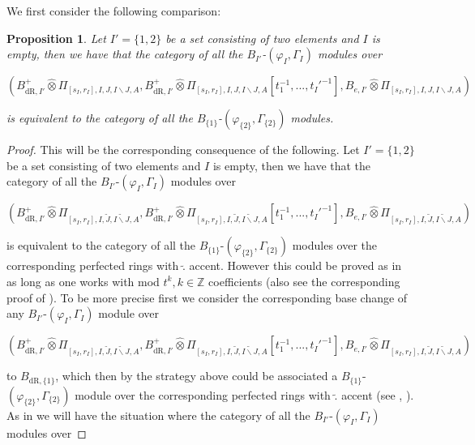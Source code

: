 \documentclass[12pt]{amsart}
\newtheorem{proposition}[theorem]{Proposition}
\theoremstyle{definition}
\numberwithin{equation}{section}
\begin{document}
\indent We first consider the following comparison:
%
\begin{proposition}
Let $I'=\{1,2\}$ be a set consisting of two elements and $I$ is empty, then we have that the category of all the $B_{I'}$-$(\varphi_I,\Gamma_I)$ modules over 
\begin{center}
$(B^+_{\mathrm{dR},I'}	\widehat{\otimes}\Pi_{[s_I,r_I],I,J,I\backslash J,A},B^+_{\mathrm{dR},I'}	\widehat{\otimes}\Pi_{[s_I,r_I],I,J,I\backslash J,A}[t_1^{-1},...,t_I'^{-1}],B_{e,I'}	\widehat{\otimes}\Pi_{[s_I,r_I],I,J,I\backslash J,A})$	
\end{center}
is equivalent to the category of all the $B_{\{1\}}$-$(\varphi_{\{2\}},\Gamma_{\{2\}})$ modules.
%
\end{proposition}
%
%
\begin{proof}
This will be the corresponding consequence of the following. Let $I'=\{1,2\}$ be a set consisting of two elements and $I$ is empty, then we have that the category of all the $B_{I'}$-$(\varphi_I,\Gamma_I)$ modules over 
\begin{center}
$(B^+_{\mathrm{dR},I'}	\widehat{\otimes}\Pi_{[s_I,r_I],I,\widetilde{J},\widetilde{I\backslash J},A},B^+_{\mathrm{dR},I'}	\widehat{\otimes}\Pi_{[s_I,r_I],I,\widetilde{J},\widetilde{I\backslash J},A}[t_1^{-1},...,t_I'^{-1}],B_{e,I'}	\widehat{\otimes}\Pi_{[s_I,r_I],I,\widetilde{J},\widetilde{I\backslash J},A})$	
\end{center}
is equivalent to the category of all the $B_{\{1\}}$-$(\varphi_{\{2\}},\Gamma_{\{2\}})$ modules over the corresponding perfected rings with $\widetilde{.}$ accent. However this could be proved as in \cite[Theorem 2.18]{KP} as long as one works with mod $t^k,k\in \mathbb{Z}$ coefficients (also see the corresponding proof of \cite[Proposition 3.8]{T3}). To be more precise first we consider the corresponding base change of any $B_{I'}$-$(\varphi_I,\Gamma_I)$ module over 
\begin{center}
$(B^+_{\mathrm{dR},I'}	\widehat{\otimes}\Pi_{[s_I,r_I],I,\widetilde{J},\widetilde{I\backslash J},A},B^+_{\mathrm{dR},I'}	\widehat{\otimes}\Pi_{[s_I,r_I],I,\widetilde{J},\widetilde{I\backslash J},A}[t_1^{-1},...,t_I'^{-1}],B_{e,I'}	\widehat{\otimes}\Pi_{[s_I,r_I],I,\widetilde{J},\widetilde{I\backslash J},A})$	
\end{center}
to $B_\mathrm{dR,\{1\}}$, which then by the strategy above could be associated a $B_{\{1\}}$-$(\varphi_{\{2\}},\Gamma_{\{2\}})$ module over the corresponding perfected rings with $\widetilde{.}$ accent (see \cite[Theorem 2.18]{KP}, \cite[Proposition 3.8]{T3}). As in \cite[Theorem 2.18]{KP} we will have the situation where the category of all the $B_{I'}$-$(\varphi_I,\Gamma_I)$ modules over 

\end{proof}
\end{document}

